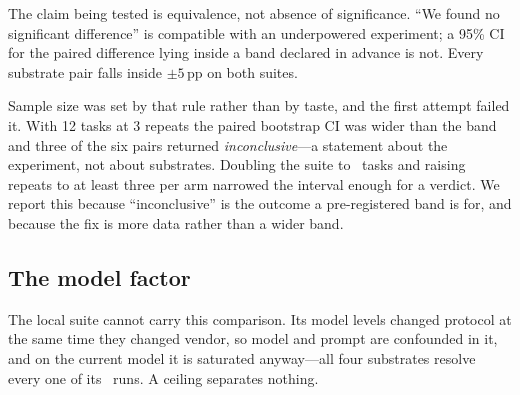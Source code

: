 \documentclass[11pt,a4paper]{article}
\begin{document}
\begin{table}[h]\centering\small
\caption{Local end-to-end tasks: \localtasks\ graded shell tasks with real
setup and real verifiers, across 4 substrates and \nmodels\ models at
\localreps\ repeats per arm---the two arms that ran first ran more---for
\localn\ runs in total. Grading is on environment state
by a verifier script, not on the agent's report.}
\label{tab:localtask}

\end{table}

\begin{table}[h]\centering\small
\caption{The same runs by substrate. pass$^\localpassk$ is computed per
(task, model) cell, so a substrate that got lucky once does not read as
consistent.}
\label{tab:localkernel}

\end{table}

\begin{table}[h]\centering\small
\caption{Pairwise substrate equivalence on graded shell work, paired by task,
pooled over models.}
\label{tab:localequiv}

\end{table}

The claim being tested is equivalence, not absence of significance. ``We found
no significant difference'' is compatible with an underpowered experiment; a
95\% CI for the paired difference lying inside a band declared in advance is
not. Every substrate pair falls inside $\pm5$\,pp on both suites.

Sample size was set by that rule rather than by taste, and the first attempt
failed it. With 12 tasks at 3 repeats the paired bootstrap CI was wider than
the band and three of the six pairs returned \emph{inconclusive}---a statement
about the experiment, not about substrates. Doubling the suite to
\localtasks\ tasks and raising repeats to at least three per arm narrowed the
interval enough for a verdict. We report this because ``inconclusive'' is the outcome a
pre-registered band is for, and because the fix is more data rather than a
wider band.

\subsection{The model factor}
\label{sec:h3}

The local suite cannot carry this comparison. Its model levels changed protocol
at the same time they changed vendor, so model and prompt are confounded in it,
and on the current model it is saturated anyway---all four substrates resolve
every one of its \localn\ runs. A ceiling separates nothing.
\end{document}
